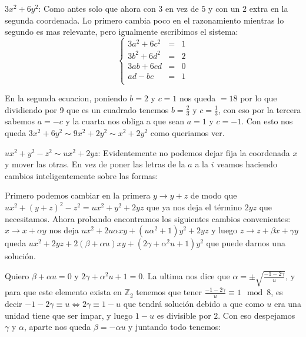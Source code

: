 \documentclass[12pt]{amsart}
\newcommand{\ZZ}{\mathbb{Z}}
\theoremstyle{plain}
\begin{document}
$3x^2+6y^2$: Como antes solo que ahora con $3$ en vez de $5$ y con un 
$2$ extra en la segunda coordenada. Lo primero cambia poco en el 
razonamiento mientras lo segundo es mas relevante, pero igualmente 
escribimos el sistema:
$$\left\{
\begin{matrix}
    3a^2+6c^2 &=&1 \\
    3b^2+6d^2 &=&2 \\
    3ab+6cd &=&0 \\
    ad-bc &=&1 \\
\end{matrix}\right.$$

En la segunda ecuacion, poniendo $b=2$ y $c=1$ nos queda $=18$ por 
lo que dividiendo por 9 que es un cuadrado tenemos $b=\frac{2}{3}$
y $c=\frac{1}{3}$, con eso por la tercera sabemos $a=-c$ y la cuarta 
nos obliga a que sean $a=1$ y $c=-1$. Con esto nos queda $3x^2+6y^2
\sim 9x^2+2y^2\sim x^2+2y^2$ como queriamos ver.

$ux^2+y^2-z^2\sim ux^2+2yz$: Evidentemente no podemos dejar fija la
coordenada $x$ y mover las otras. En vez de poner las letras de la $a$
a la $i$ veamos haciendo cambios inteligentemente sobre las formas:

Primero podemos cambiar en la primera $y\to y+z$ de modo que 
$ux^2+(y+z)^2-z^2=ux^2+y^2+2yz$ que ya nos deja el término $2yz$ que 
necesitamos. Ahora probando encontramos los siguientes cambios 
convenientes: $x\to x+\alpha y$ nos deja $ux^2+2u\alpha xy +
(u\alpha^2+1)y^2+2yz$ y luego $z\to z+\beta x+\gamma y$ queda
$ux^2+2yz+2(\beta+\alpha u)xy+(2\gamma+\alpha^2u+1)y^2$ que puede 
darnos una solución.

Quiero $\beta+\alpha u=0$ y $2\gamma+\alpha^2u+1=0$. La ultima nos 
dice que $\alpha=\pm\sqrt{\frac{-1-2\gamma}{u}}$, y para que este 
elemento exista en $\ZZ_2$ tenemos que tener $\frac{-1-2\gamma}{u}
\equiv 1\mod 8$, es decir $-1-2\gamma\equiv u \iff 2\gamma\equiv 
1-u$ que tendrá solución debido a que como $u$ era una unidad 
tiene que ser impar, y luego $1-u$ es divisible por $2$. Con eso 
despejamos $\gamma$ y $\alpha$, aparte nos queda $\beta=-\alpha u$
y juntando todo tenemos:
\end{document}
